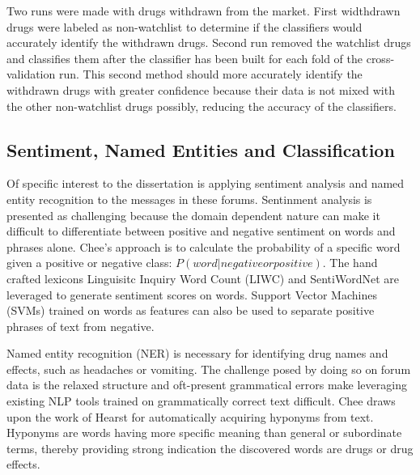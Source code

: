 \documentclass[twoside,11pt]{article}
\begin{document}
Two runs were made with drugs withdrawn from the market.  First widthdrawn drugs were labeled as non-watchlist to determine if the classifiers would accurately identify the withdrawn drugs.  Second run removed the watchlist drugs and classifies them after the classifier has been built for each fold of the cross-validation run.  This second method should more accurately identify the withdrawn drugs with greater confidence because their data is not mixed with the other non-watchlist drugs possibly, reducing the accuracy of the classifiers.














































\subsection{Sentiment, Named Entities and Classification}
Of specific interest to the dissertation is applying sentiment analysis and named
entity recognition to the messages in these forums. Sentinment analysis is presented
as challenging because the domain dependent nature \citep{Turney, 2002}
can make it difficult to differentiate between positive and negative sentiment on words and phrases alone.
Chee's approach is to calculate the probability of a specific word given a positive or negative class: $P(word| negative or positive)$.
The hand crafted lexicons Linguisitc Inquiry Word Count (LIWC) and SentiWordNet
are leveraged to generate sentiment scores on words. Support Vector Machines (SVMs)
trained on words as features can also be used to separate positive phrases of
text from negative.

Named entity recognition (NER) is necessary for identifying drug names and
effects, such as headaches or vomiting. The challenge posed by doing so
on forum data is the relaxed structure and oft-present grammatical errors
make leveraging existing NLP tools trained on grammatically correct text
difficult. Chee draws upon the work of Hearst \citep{Hearst} for automatically
acquiring hyponyms from text. Hyponyms are words having more specific meaning
than general or subordinate terms, thereby providing strong indication the discovered
words are drugs or drug effects.
\end{document}
